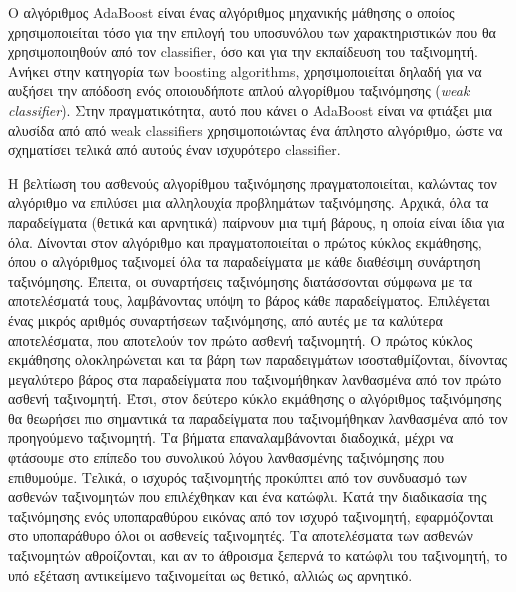 Ο αλγόριθμος AdaBoost είναι ένας αλγόριθμος μηχανικής μάθησης ο οποίος χρησιμοποιείται
τόσο για την επιλογή του υποσυνόλου των χαρακτηριστικών που θα χρησιμοποιηθούν
από τον classifier, όσο και για την εκπαίδευση του ταξινομητή. Ανήκει στην κατηγορία
των boosting algorithms, χρησιμοποιείται δηλαδή για να αυξήσει την απόδοση ενός
οποιουδήποτε απλού αλγορίθμου ταξινόμησης (\emph{weak classifier}). Στην πραγματικότητα,
αυτό που κάνει ο AdaBoost είναι να φτιάξει μια αλυσίδα από από weak classifiers
χρησιμοποιώντας ένα άπληστο αλγόριθμο, ώστε να σχηματίσει τελικά από αυτούς έναν
ισχυρότερο classifier.

Η βελτίωση του ασθενούς αλγορίθμου ταξινόμησης πραγματοποιείται, καλώντας τον
αλγόριθμο να επιλύσει μια αλληλουχία προβλημάτων ταξινόμησης. Αρχικά, όλα τα παραδείγματα
(θετικά και αρνητικά) παίρνουν μια τιμή βάρους, η οποία είναι ίδια για όλα. ∆ίνονται στον
αλγόριθμο και πραγματοποιείται ο πρώτος κύκλος εκμάθησης, όπου ο
αλγόριθμος ταξινομεί όλα τα παραδείγματα με κάθε διαθέσιμη συνάρτηση ταξινόμησης. Έπειτα,
οι συναρτήσεις ταξινόμησης διατάσσονται σύμφωνα με τα αποτελέσματά τους, λαμβάνοντας υπόψη
το βάρος κάθε παραδείγματος. Επιλέγεται ένας μικρός αριθμός συναρτήσεων ταξινόμησης, από
αυτές με τα καλύτερα αποτελέσματα, που αποτελούν τον πρώτο ασθενή ταξινομητή. Ο πρώτος
κύκλος εκμάθησης ολοκληρώνεται και τα βάρη των παραδειγμάτων ισοσταθμίζονται, δίνοντας
μεγαλύτερο βάρος στα παραδείγματα που ταξινομήθηκαν λανθασμένα από τον πρώτο ασθενή
ταξινομητή. Έτσι, στον δεύτερο κύκλο εκμάθησης ο αλγόριθμος ταξινόμησης θα θεωρήσει πιο
σημαντικά τα παραδείγματα που ταξινομήθηκαν λανθασμένα από τον προηγούμενο ταξινομητή.
Τα βήματα επαναλαμβάνονται διαδοχικά, μέχρι να φτάσουμε στο επίπεδο του συνολικού λόγου
λανθασμένης ταξινόμησης που επιθυμούμε. Τελικά, ο ισχυρός ταξινομητής προκύπτει από τον
συνδυασμό των ασθενών ταξινομητών που επιλέχθηκαν και ένα κατώφλι. Κατά την διαδικασία της
ταξινόμησης ενός υποπαραθύρου εικόνας από τον ισχυρό ταξινομητή, εφαρμόζονται στο
υποπαράθυρο όλοι οι ασθενείς ταξινομητές. Τα αποτελέσματα των ασθενών ταξινομητών
αθροίζονται, και αν το άθροισμα ξεπερνά το κατώφλι του ταξινομητή, το υπό εξέταση αντικείμενο
ταξινομείται ως θετικό, αλλιώς ως αρνητικό.



